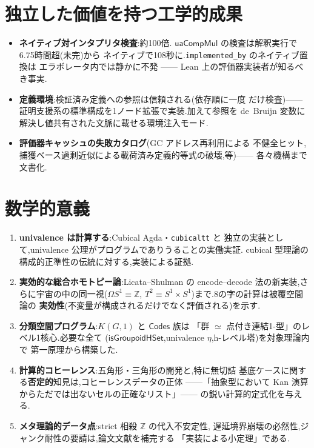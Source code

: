 \documentclass[11pt]{ltjsarticle}
\newcommand{\Z}{\mathbb{Z}}
\newcommand{\op}[1]{\ensuremath{\mathsf{#1}}}
\begin{document}
\section{独立した価値を持つ工学的成果}
\begin{itemize}[leftmargin=1.5em]
\item \textbf{ネイティブ対インタプリタ検査}:約100倍.
$\op{uaCompMul}$ の検査は解釈実行で6.75時間超(未完)から
ネイティブで108秒に.\texttt{implemented\_by} のネイティブ置換は
エラボレータ内では静かに不発 —— Lean 上の評価器実装者が知るべき事実.
\item \textbf{定義環境}:検証済み定義への参照は信頼される(依存順に一度
だけ検査)—— 証明支援系の標準構成を1ノード拡張で実装.加えて参照を
de~Bruijn 変数に解決し値共有された文脈に載せる環境注入モード.
\item \textbf{評価器キャッシュの失敗カタログ}(GC アドレス再利用による
不健全ヒット,捕獲ベース過剰近似による載荷済み定義的等式の破壊,等)——
各々機構まで文書化.
\end{itemize}

\section{数学的意義}
\begin{enumerate}[leftmargin=1.7em]
\item \textbf{univalence は計算する}:Cubical Agda・\texttt{cubicaltt} と
独立の実装として,univalence 公理がプログラムでありうることの実働実証.
cubical 型理論の構成的正準性の伝統に対する,実装による証拠.
\item \textbf{実効的な総合ホモトピー論}:Licata--Shulman の encode--decode
法の新実装,さらに宇宙の中の同一視($\Omega S^1\equiv\Z$,
$T^2\equiv S^1{\times}S^1$)まで.8の字の計算は被覆空間論の
\textbf{実効性}(不変量が構成されるだけでなく評価される)を示す.
\item \textbf{分類空間プログラム}:$K(G,1)$ と $\op{Codes}$ 族は
「群 $\simeq$ 点付き連結1-型」のレベル1核心.必要な全て
($\op{isGroupoidHSet}$,univalence $\eta$,h-レベル塔)を対象理論内で
第一原理から構築した.
\item \textbf{計算的コヒーレンス}:五角形・三角形の開発と,特に無切詰
基底ケースに関する\textbf{否定的}知見は,コヒーレンスデータの正体
——「抽象型において Kan 演算からただでは出ないセルの正確なリスト」——
の鋭い計算的定式化を与える.
\item \textbf{メタ理論的データ点}:strict 相殺 $\Z$ の代入不安定性,
遅延境界崩壊の必然性,ジャンク耐性の要請は,論文文献を補完する
「実装による小定理」である.
\end{enumerate}
\end{document}
